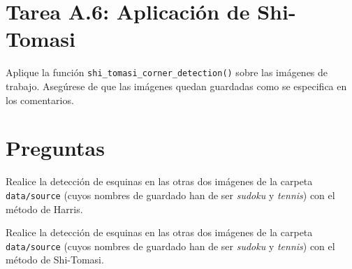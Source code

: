 \section*{Tarea A.6: Aplicación de Shi-Tomasi}
Aplique la función \texttt{shi\_tomasi\_corner\_detection()} sobre las imágenes de trabajo. Asegúrese de que las imágenes quedan guardadas como se especifica en los comentarios.

\section*{Preguntas}

\vspace{5mm}
\begin{tcolorbox}[colback=gray!10, colframe=gray!30, coltitle=black, title=Pregunta A.1, halign=left]
Realice la detección de esquinas en las otras dos imágenes de la carpeta \texttt{data/source} (cuyos nombres de guardado han de ser \textit{sudoku} y \textit{tennis}) con el método de Harris.
\end{tcolorbox}

\vspace{5mm}
\begin{tcolorbox}[colback=gray!10, colframe=gray!30, coltitle=black, title=Pregunta A.2, halign=left]
Realice la detección de esquinas en las otras dos imágenes de la carpeta \texttt{data/source} (cuyos nombres de guardado han de ser \textit{sudoku} y \textit{tennis}) con el método de Shi-Tomasi.
\end{tcolorbox}